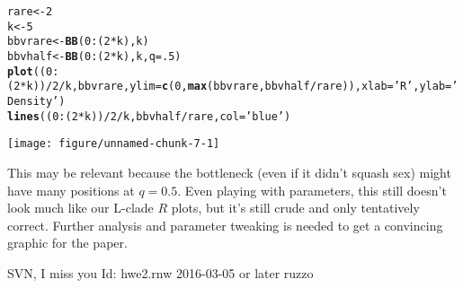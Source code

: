 \documentclass{article}\usepackage[]{graphicx}\usepackage[]{color}
\makeatletter
\def\maxwidth{ %
  \ifdim\Gin@nat@width>\linewidth
    \linewidth
  \else
    \Gin@nat@width
  \fi
}
\newcommand{\hlnum}[1]{\textcolor[rgb]{0.686,0.059,0.569}{#1}}%
\newcommand{\hlstr}[1]{\textcolor[rgb]{0.192,0.494,0.8}{#1}}%
\newcommand{\hlopt}[1]{\textcolor[rgb]{0,0,0}{#1}}%
\newcommand{\hlstd}[1]{\textcolor[rgb]{0.345,0.345,0.345}{#1}}%
\newcommand{\hlkwb}[1]{\textcolor[rgb]{0.69,0.353,0.396}{#1}}%
\newcommand{\hlkwc}[1]{\textcolor[rgb]{0.333,0.667,0.333}{#1}}%
\newcommand{\hlkwd}[1]{\textcolor[rgb]{0.737,0.353,0.396}{\textbf{#1}}}%
\newenvironment{kframe}{%
 \def\at@end@of@kframe{}%
 \ifinner\ifhmode%
  \def\at@end@of@kframe{\end{minipage}}%
  \begin{minipage}{\columnwidth}%
 \fi\fi%
 \def\FrameCommand##1{\hskip\@totalleftmargin \hskip-\fboxsep
 \colorbox{shadecolor}{##1}\hskip-\fboxsep
     \hskip-\linewidth \hskip-\@totalleftmargin \hskip\columnwidth}%
 \MakeFramed {\advance\hsize-\width
   \@totalleftmargin\z@ \linewidth\hsize
   \@setminipage}}%
 {\par\unskip\endMakeFramed%
 \at@end@of@kframe}
\newenvironment{knitrout}{}{} %
\makeatother
\begin{document}
\begin{knitrout}\footnotesize
{}\color{fgcolor}\begin{kframe}
\begin{alltt}
\hlstd{rare} \hlkwb{<-} \hlnum{2}
\hlstd{k} \hlkwb{<-} \hlnum{5}
\hlstd{bbvrare} \hlkwb{<-} \hlkwd{BB}\hlstd{(}\hlnum{0}\hlopt{:}\hlstd{(}\hlnum{2}\hlopt{*}\hlstd{k), k)}
\hlstd{bbvhalf} \hlkwb{<-} \hlkwd{BB}\hlstd{(}\hlnum{0}\hlopt{:}\hlstd{(}\hlnum{2}\hlopt{*}\hlstd{k), k,} \hlkwc{q}\hlstd{=}\hlnum{.5}\hlstd{)}
\hlkwd{plot} \hlstd{((}\hlnum{0}\hlopt{:}\hlstd{(}\hlnum{2}\hlopt{*}\hlstd{k))}\hlopt{/}\hlnum{2}\hlopt{/}\hlstd{k, bbvrare,} \hlkwc{ylim}\hlstd{=}\hlkwd{c}\hlstd{(}\hlnum{0}\hlstd{,} \hlkwd{max}\hlstd{(bbvrare,bbvhalf}\hlopt{/}\hlstd{rare)),} \hlkwc{xlab}\hlstd{=}\hlstr{'R'}\hlstd{,}\hlkwc{ylab}\hlstd{=}\hlstr{'Density'}\hlstd{)}
\hlkwd{lines}\hlstd{((}\hlnum{0}\hlopt{:}\hlstd{(}\hlnum{2}\hlopt{*}\hlstd{k))}\hlopt{/}\hlnum{2}\hlopt{/}\hlstd{k, bbvhalf}\hlopt{/}\hlstd{rare,}\hlkwc{col}\hlstd{=}\hlstr{'blue'}\hlstd{)}
\end{alltt}
\end{kframe}
\texttt{[image: figure/unnamed-chunk-7-1]} 

\end{knitrout}

This may be relevant because the bottleneck (even if it didn't squash sex) might have many positions at $q=0.5$.  Even playing with parameters, this still doesn't look much like our L-clade $R$ plots, but it's still crude and only tentatively correct.  Further analysis and parameter tweaking is needed to get a convincing graphic for the paper.
\fi




\mbox{}\vfill\footnotesize\flushright SVN, I miss you $ $Id: hwe2.rnw  2016-03-05 or later  ruzzo $ $
\end{document}
